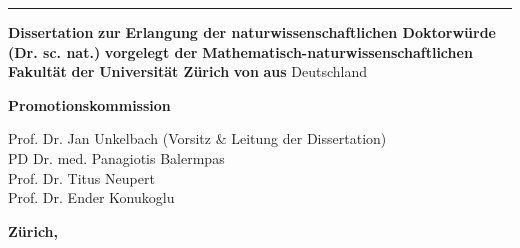\documentclass[\relativeRoot/main.tex]{subfiles}
\begin{document}
    \begin{titlepage}
        \begin{center}
            \begin{minipage}{0.7\textwidth}
                \centering
                \large
                \thetitle
            \end{minipage} 
            \vspace{4mm}

            \hrule
            \vspace{2cm}

            \textbf{Dissertation} \vfill
            \textbf{zur} \vfill
            \textbf{Erlangung der naturwissenschaftlichen Doktorwürde} \\
            \textbf{(Dr. sc. nat.)} \vfill
            \textbf{vorgelegt der} \vfill
            \textbf{Mathematisch-naturwissenschaftlichen Fakultät} \vfill
            \textbf{der} \vfill
            \textbf{Universität Zürich} \vfill
            \textbf{von} \vfill
            \theauthor \vfill
            \textbf{aus} \vfill
            Deutschland
            
            \vspace{3cm}
            
            \textbf{Promotionskommission} \vfill
            \hspace{0.15\textwidth} \begin{minipage}{0.75\textwidth}
                Prof. Dr. Jan Unkelbach (Vorsitz \& Leitung der Dissertation)\\
                PD Dr. med. Panagiotis Balermpas\\
                Prof. Dr. Titus Neupert\\
                Prof. Dr. Ender Konukoglu
            \end{minipage} \vfill
            \textbf{Zürich, \thedate}
                
        \end{center}
    \end{titlepage}
\end{document}
